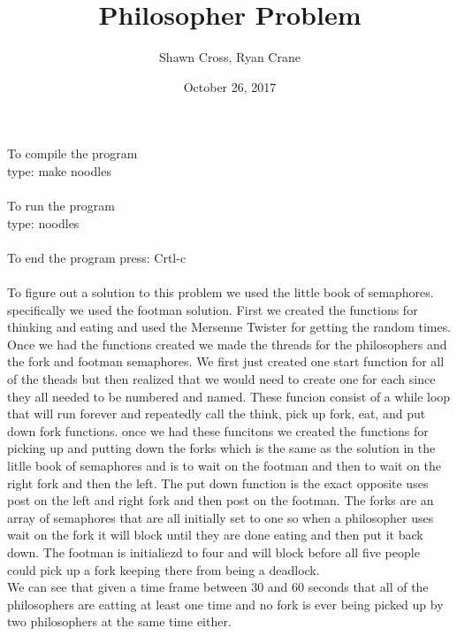 \documentclass[letterpaper,10pt,titlepage]{article}
\begin{document}
\title{Philosopher Problem}
\date{October 26, 2017}
\author{Shawn Cross, Ryan Crane}
\maketitle

To compile the program\\

type: make noodles\\\\

To run the program\\

type: noodles\\\\

To end the program press: Crtl-c\\\\

To figure out a solution to this problem we used the little book of semaphores. 
specifically we used the footman solution. First we created the functions for 
thinking and eating and used the Mersenne Twister for getting the random times. 
Once we had the functions created we made the threads for the philosophers and 
the fork and footman semaphores. We first just created one start function for 
all of the theads but then realized that we would need to create one for each 
since they all needed to be numbered and named. These funcion consist of a 
while loop that will run forever and repeatedly call the think, pick up fork, 
eat, and put down fork functions. once we had these funcitons we created the 
functions for picking up and putting down the forks which is the same as the 
solution in the litlle book of semaphores and is to wait on the footman and 
then to wait on the right fork and then the left. The put down function is 
the exact opposite uses post on the left and right fork and then post on the 
footman. The forks are an array of semaphores that are all initially set to 
one so when a philosopher uses wait on the fork it will block until they are 
done eating and then put it back down. The footman is initialiezd to four and 
will block before all five people could pick up a fork keeping there from being 
a deadlock.\\ 

We can see that given a time frame between 30 and 60 seconds that all of the 
philosophers are eatting at least one time and no fork is ever being picked 
up by two philosophers at the same time either. 
\end{document}
